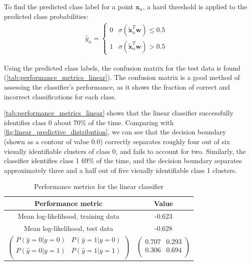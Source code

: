 \documentclass[a4paper]{article}
\begin{document}
    To find the predicted class label for a point $\boldsymbol{x}_n$, a hard threshold is applied to the predicted class
    probabilities:
    \begin{align*}
        \hat{y}_n = \begin{cases}
                        0 & \sigma(\tilde{\boldsymbol{x}}_n^T \boldsymbol{w}) \leq 0.5 \\
                        1 & \sigma(\tilde{\boldsymbol{x}}_n^T \boldsymbol{w}) > 0.5
                    \end{cases}
    \end{align*}

    Using the predicted class labels, the confusion matrix for the test data is found
    (\autoref{tab:performance_metrics_linear}). The confusion matrix is a good method of assessing the classifier's
    performance, as it shows the fraction of correct and incorrect classifications for each class.

    \autoref{tab:performance_metrics_linear} shows that the linear classifier successfully identifies class 0 about
    70\% of the time. Comparing with \autoref{fig:linear_predictive_distribution}, we can see that the decision boundary
    (shown as a contour of value 0.0) correctly separates roughly four out of six visually identifiable clusters of
    class 0, and fails to account for two. Similarly, the classifier identifies class 1 69\% of the time, and the
    decision boundary separates approximately three and a half out of five visually identifiable class 1 clusters.

    \begin{table}[h]
        \centering
        \begin{tabular}{c|c}
            \textbf{Performance metric} & \textbf{Value} \\
            \hline
            Mean log-likelihood, training data & -0.623 \\
            Mean log-likelihood, test data & -0.628 \\
            $\begin{pmatrix}
                 P(\hat{y}=0 | y=0) & P(\hat{y}=1 | y=0) \\
                 P(\hat{y}=0 | y=1) & P(\hat{y}=1 | y=1) \\
            \end{pmatrix}$ &
            $\begin{pmatrix}
                0.707 & 0.293 \\
                0.306 & 0.694 \\
            \end{pmatrix}$ \\
        \end{tabular}
        \caption{Performance metrics for the linear classifier}
        \label{tab:performance_metrics_linear}
    \end{table}
\end{document}

